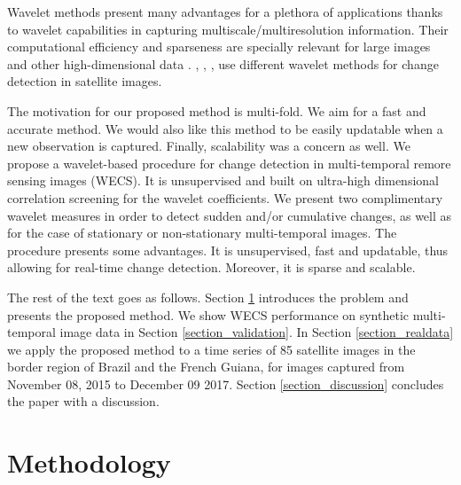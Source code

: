 \documentclass[journal]{IEEEtran}
\begin{document}
Wavelet methods present many advantages for a plethora of applications \cite{vidakovic1999statistical} thanks to wavelet capabilities in capturing multiscale/multiresolution information. Their computational efficiency and sparseness are specially relevant for large images and other high-dimensional data \cite{morettin2017wavelets}. \cite{atto2012multidate}, \cite{bouhlel2015multivariate}, \cite{celik2009multiscale}, \cite{cui2012statistical} use different wavelet methods for change detection in satellite images. 

The motivation for our proposed method is multi-fold. We aim for a fast and accurate method. We would also like this method to be easily updatable when a new observation is captured. Finally, scalability was a concern as well. We propose a wavelet-based procedure for change detection in multi-temporal remore sensing images (WECS). It is unsupervised and built on ultra-high dimensional correlation screening \cite{fan2020statistical} for the wavelet coefficients.  We present two complimentary wavelet measures in order to detect sudden and/or cumulative changes, as well as for the case of stationary or non-stationary multi-temporal images. The procedure presents some advantages. It is unsupervised, fast and updatable, thus allowing for real-time change detection. Moreover, it is sparse and scalable. 

The rest of the text goes as follows. Section \ref{section_method} introduces the problem and presents the proposed method. We show WECS performance on synthetic multi-temporal image data in Section \ref{section_validation}. In Section \ref{section_realdata} we apply the proposed method to a time series of 85 satellite images in the border region of Brazil and the French Guiana, for  images captured from November 08, 2015 to December 09 2017.  Section \ref{section_discussion} concludes the paper with a discussion.


\section{Methodology}\label{section_method}
\end{document}
